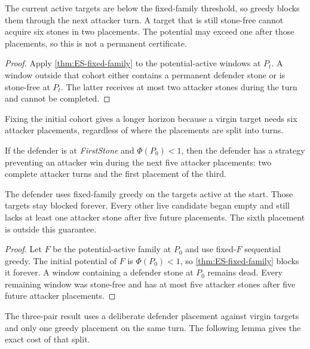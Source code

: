 \begin{plainterms}
The current active targets are below the fixed-family threshold, so greedy
blocks them through the next attacker turn.  A target that is still
stone-free cannot acquire six stones in two placements.  The potential may
exceed one after those placements, so this is not a permanent certificate.
\end{plainterms}

\begin{proof}
Apply \cref{thm:ES-fixed-family} to the potential-active windows at $P_t$.  A window
outside that cohort either contains a permanent defender stone or is
stone-free at $P_t$.  The latter receives at most two attacker stones during
the turn and cannot be completed.
\end{proof}

Fixing the initial cohort gives a longer horizon because a virgin target
needs six attacker placements, regardless of where the placements are split
into turns.

\begin{theorem}
\label{thm:ES-five-placement}
If the defender is at \emph{FirstStone} and $\Phi(P_0)<1$, then the defender
has a strategy preventing an attacker win during the next five attacker
placements: two complete attacker turns and the first placement of the third.
\end{theorem}

\begin{plainterms}
The defender uses fixed-family greedy on the targets active at the start.
Those targets stay blocked forever.  Every other live candidate began empty
and still lacks at least one attacker stone after five future placements.
The sixth placement is outside this guarantee.
\end{plainterms}

\begin{proof}
Let $F$ be the potential-active family at $P_0$ and use fixed-$F$ sequential greedy.
The initial potential of $F$ is $\Phi(P_0)<1$, so
\cref{thm:ES-fixed-family} blocks it forever.  A window containing a defender
stone at $P_0$ remains dead.  Every remaining window was stone-free and has at
most five attacker stones after five future attacker placements.
\end{proof}

The three-pair result uses a deliberate defender placement against virgin
targets and only one greedy placement on the same turn.  The following lemma
gives the exact cost of that split.

